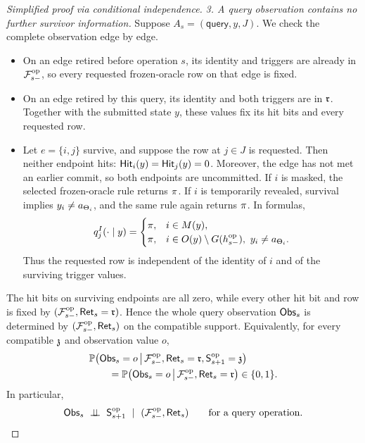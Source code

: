 {\begin{proof}[Simplified proof via conditional independence]
\emph{3. A query observation contains no further survivor information.}
Suppose \(A_s=(\mathsf{query},y,J)\).  We check the complete observation
edge by edge.
\begin{itemize}
\item On an edge retired before operation \(s\), its identity and triggers
are already in \(\OpAnalyticField{s}\), so every requested frozen-oracle row
on that edge is fixed.
\item On an edge retired by this query, its identity and both triggers are
in \(\RetiredRecordValue\).  Together with the submitted state \(y\), these values
fix its hit bits and every requested row.
\item Let \(e=\{i,j\}\) survive, and suppose the row at \(j\in J\) is
requested.  Then neither endpoint hits:
\(
 \HardHit{y}{i}=\HardHit{y}{j}=0
\).
Moreover, the edge has not met an earlier commit, so both endpoints are
uncommitted.  If \(i\) is masked, the selected frozen-oracle rule returns
\(\HardMarginal\).  If \(i\) is temporarily revealed, survival implies
\(y_i\ne\HardCandidate{\TriggerIndex{i}}\), and the same rule again returns
\(\HardMarginal\).  In formulas,
\[
 \HardOracleRow{I}{y}{j}
 =\begin{cases}
   \HardMarginal,&i\in\MaskSet{y},\\
   \HardMarginal,&
       i\in\ObservedSet{y}\setminus G(\OpVisibleHistory{s}),
       \ y_i\ne\HardCandidate{\TriggerIndex{i}}.
  \end{cases}
\]
Thus the requested row is independent of the identity of \(i\) and of the
surviving trigger values.
\end{itemize}
The hit bits on surviving endpoints are all zero, while every other hit bit
and row is fixed by
\((\OpAnalyticField{s},\OpRetiredRecord{s}=\RetiredRecordValue)\).
Hence the whole query observation \(\OpObservation{s}\) is determined by
\((\OpAnalyticField{s},\OpRetiredRecord{s})\) on the compatible support.
Equivalently, for every compatible \(\SurvivorConfigA\) and observation
value \(o\),
\begin{align*}
 &\mathbb P\!\left(
   \OpObservation{s}=o
   \,\middle|\,
   \OpAnalyticField{s},
   \OpRetiredRecord{s}=\RetiredRecordValue,
   \OpSurvivorState{s+1}=\SurvivorConfigA\right)\\
 &\qquad=
 \mathbb P\!\left(
   \OpObservation{s}=o
   \,\middle|\,
   \OpAnalyticField{s},
   \OpRetiredRecord{s}=\RetiredRecordValue\right)
 \in\{0,1\}.
\end{align*}
In particular,
\[
 \OpObservation{s}\ \perp\!\!\!\perp\ \OpSurvivorState{s+1}
 \ \mid\
 (\OpAnalyticField{s},\OpRetiredRecord{s})
 \qquad\text{for a query operation.}
\]


\end{proof}}

